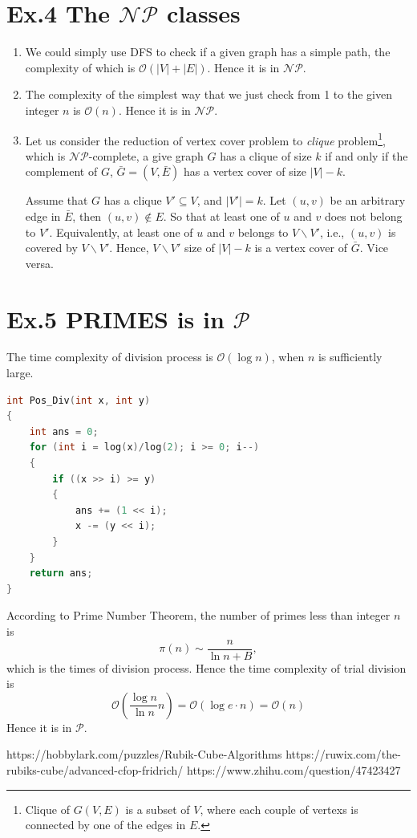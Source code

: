 \documentclass[a4paper]{article}
\begin{document}
\section*{Ex.4 The $\mathcal{NP}$ classes}
\begin{enumerate}
	\item We could simply use DFS to check if a given graph has a simple path, the complexity of which is $\mathcal{O}(|V|+|E|)$. Hence it is in $\mathcal{NP}$.
	\item The complexity of the simplest way that we just check from 1 to the given integer $n$ is $\mathcal{O}(n)$. Hence it is in $\mathcal{NP}$.
	\item Let us consider the reduction of vertex cover problem to {\it clique} problem\footnote{Clique of $G(V,E)$ is a subset of $V$, where each couple of vertexs is connected by one of the edges in $E$.}, which is $\mathcal{NP}$-complete, a give graph $G$ has a clique of size $k$ if and only if the complement of $G$, $\bar{G}=(V,\bar{E})$ has a vertex cover of size $|V|-k$.\par
	Assume that $G$ has a clique $V'\subseteq V$, and $|V'|=k$. Let $(u,v)$ be an arbitrary edge in $\bar{E}$, then $(u,v)\notin E$. So that at least one of $u$ and $v$ does not belong to $V'$. Equivalently, at least one of $u$ and $v$ belongs to $V\backslash V'$, i.e., $(u,v)$ is covered by $V\backslash V'$. Hence, $V\backslash V'$ size of $|V|-k$ is a vertex cover of $\bar{G}$. Vice versa.
\end{enumerate}

\section*{Ex.5 PRIMES is in $\mathcal{P}$}
The time complexity of division process\cite{ref3} is $\mathcal{O}(\log{n})$, when $n$ is sufficiently large.
\begin{lstlisting}[language=C]
int Pos_Div(int x, int y)
{
	int ans = 0;
	for (int i = log(x)/log(2); i >= 0; i--)
	{
		if ((x >> i) >= y)
		{
			ans += (1 << i);
			x -= (y << i);
		}
	}
	return ans;
}
\end{lstlisting}
According to Prime Number Theorem, the number of primes less than integer $n$ is
$$\pi(n) \sim \frac{n}{\ln{n} + B},$$
which is the times of division process. Hence the time complexity of trial division is
$$\mathcal{O}\left(\frac{\log{n}}{\ln{n}}n\right)=\mathcal{O}(\log{e}\cdot n) = \mathcal{O}(n)$$
Hence it is in $\mathcal{P}$.
\begin{thebibliography}{99}
https://hobbylark.com/puzzles/Rubik-Cube-Algorithms
https://ruwix.com/the-rubiks-cube/advanced-cfop-fridrich/
https://www.zhihu.com/question/47423427
\end{thebibliography}
\end{document}
